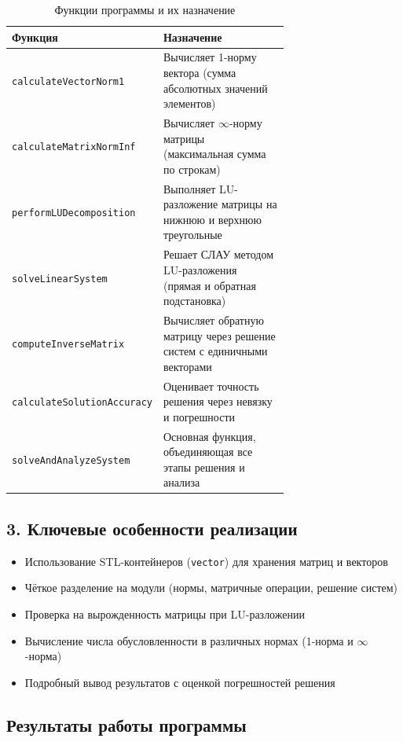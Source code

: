 \documentclass[12pt, a4paper]{article}
\begin{document}
\begin{table}[h]
\centering
\caption{Функции программы и их назначение}
\begin{tabular}{|l|p{0.7\linewidth}|}
\hline
\textbf{Функция} & \textbf{Назначение} \\
\hline
\texttt{calculateVectorNorm1} & Вычисляет 1-норму вектора (сумма абсолютных значений элементов) \\
\texttt{calculateMatrixNormInf} & Вычисляет $\infty$-норму матрицы (максимальная сумма по строкам) \\
\texttt{performLUDecomposition} & Выполняет LU-разложение матрицы на нижнюю и верхнюю треугольные \\
\texttt{solveLinearSystem} & Решает СЛАУ методом LU-разложения (прямая и обратная подстановка) \\
\texttt{computeInverseMatrix} & Вычисляет обратную матрицу через решение систем с единичными векторами \\
\texttt{calculateSolutionAccuracy} & Оценивает точность решения через невязку и погрешности \\
\texttt{solveAndAnalyzeSystem} & Основная функция, объединяющая все этапы решения и анализа \\
\hline
\end{tabular}
\end{table}
\subsection*{3. Ключевые особенности реализации}
\begin{itemize}
\item Использование STL-контейнеров (\texttt{vector}) для хранения матриц и векторов
\item Чёткое разделение на модули (нормы, матричные операции, решение систем)
\item Проверка на вырожденность матрицы при LU-разложении
\item Вычисление числа обусловленности в различных нормах (1-норма и $\infty$-норма)
\item Подробный вывод результатов с оценкой погрешностей решения
\end{itemize}
\subsection*{Результаты работы программы}
\end{document}
